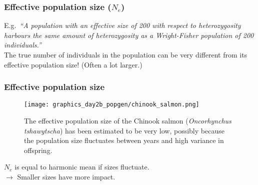 \documentclass{beamer}
\newcommand{\1}{\ensuremath{\mathbf{1}}}
\begin{document}
%
%
%
\begin{frame}\frametitle{Effective population size ($N_e$)}
	E.g.\ \emph{``A population with an effective size of 200 with respect to heterozygosity harbours the same amount of heterozygosity as a Wright-Fisher population of 200 individuals.''}\\[2ex]
	The true number of individuals in the population can be very different from its effective population size! (Often a lot larger.)
\end{frame}
%
%
%
\begin{frame}\frametitle{Effective population size}
	\begin{figure}
	\begin{center}
		\texttt{[image: graphics\_day2b\_popgen/chinook\_salmon.png]}
	\end{center}
	\caption{The effective population size of the Chinook salmon (\emph{Oncorhynchus tshawytscha}) has been estimated to be very low, possibly because the population size fluctuates between years and high variance in offspring.}
	\end{figure}
	$N_e$ is equal to harmonic mean if sizes fluctuate.\\
	$\to$ Smaller sizes have more impact.
\end{frame}
%
%
%
\end{document}
